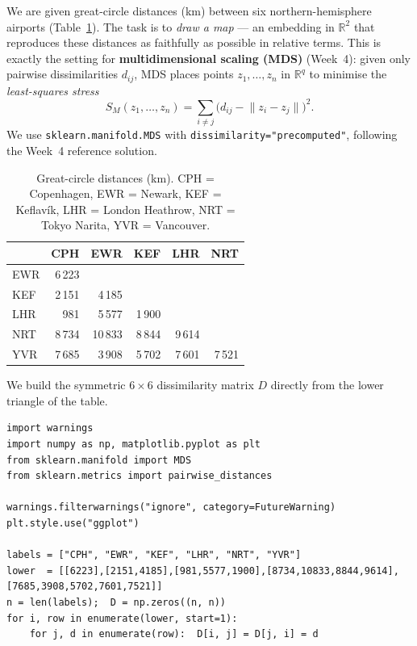\documentclass[10pt,a4paper]{article}
\begin{document}
We are given great-circle distances (km) between six northern-hemisphere airports (Table~\ref{tab:airports}). The task is to \emph{draw a map} --- an embedding in $\mathbb{R}^2$ that reproduces these distances as faithfully as possible in relative terms. This is exactly the setting for \textbf{multidimensional scaling (MDS)} (Week~4): given only pairwise dissimilarities $d_{ij}$, MDS places points $z_1,\dots,z_n$ in $\mathbb{R}^q$ to minimise the \emph{least-squares stress}
\[
  S_M(z_1,\dots,z_n) = \sum_{i\neq j}\bigl(d_{ij} - \lVert z_i - z_j\rVert\bigr)^2.
\]
We use \texttt{sklearn.manifold.MDS} with \texttt{dissimilarity="precomputed"}, following the Week~4 reference solution.

\begin{table}[h]
  \centering\small
  \begin{tabular}{lrrrrr}
    \toprule
           & CPH   & EWR    & KEF   & LHR   & NRT  \\
    \midrule
    EWR &  6\,223 &        &       &       &      \\
    KEF &  2\,151 &  4\,185 &      &       &      \\
    LHR &    981  &  5\,577 & 1\,900 &     &      \\
    NRT &  8\,734 & 10\,833 & 8\,844 & 9\,614 &  \\
    YVR &  7\,685 &  3\,908 & 5\,702 & 7\,601 & 7\,521 \\
    \bottomrule
  \end{tabular}
  \caption{Great-circle distances (km). CPH = Copenhagen, EWR = Newark, KEF = Keflavík, LHR = London Heathrow, NRT = Tokyo Narita, YVR = Vancouver.}
  \label{tab:airports}
\end{table}

We build the symmetric $6\times 6$ dissimilarity matrix $D$ directly from the lower triangle of the table.

\begin{lstlisting}
import warnings
import numpy as np, matplotlib.pyplot as plt
from sklearn.manifold import MDS
from sklearn.metrics import pairwise_distances

warnings.filterwarnings("ignore", category=FutureWarning)
plt.style.use("ggplot")

labels = ["CPH", "EWR", "KEF", "LHR", "NRT", "YVR"]
lower  = [[6223],[2151,4185],[981,5577,1900],[8734,10833,8844,9614],[7685,3908,5702,7601,7521]]
n = len(labels);  D = np.zeros((n, n))
for i, row in enumerate(lower, start=1):
    for j, d in enumerate(row):  D[i, j] = D[j, i] = d
\end{lstlisting}
\end{document}
